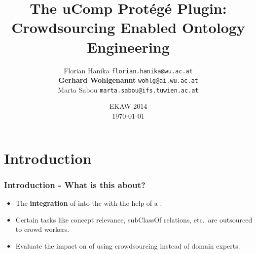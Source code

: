 \documentclass{beamer}
\title[uComp Prot\'eg\'e Plugin]{The uComp Prot\'eg\'e Plugin:\\ Crowdsourcing Enabled Ontology Engineering}
\author[Hanika et al.]{
\small{
Florian Hanika \inst{1} \texttt{florian.hanika@wu.ac.at} \\
\textbf{Gerhard Wohlgenannt} \inst{1} \texttt{wohlg@ai.wu.ac.at} \\
Marta Sabou\inst{2}  \texttt{marta.sabou@ifs.tuwien.ac.at} \\
}}
\institute{Institut f. Informationswirtschaft}
\institute[InfoBiz, WU Vienna] %
{
  \inst{1}%
  Institute f. Information Business,
  \textbf{Vienna Univ. of Economics (WU)}, Austria

  \inst{2}%
  \textbf{Technical University (TU), Vienna}, Austria
}
\date[EKAW 2014]{EKAW 2014\\ \today}
\begin{document}

\begin{frame}
  \titlepage
\end{frame}

%
%
%
%
%
%




\section{Introduction}
\begin{frame}
  \frametitle{Introduction - What is this about?}
  \begin{itemize}
        \item The \textbf{integration} of  into the  with the help of a .
    \vspace{0.5cm}
        \item Certain tasks like  concept relevance, subClassOf relations, etc.~are outsourced to crowd workers.
    \vspace{0.5cm}
        \item Evaluate the impact on  of using crowdsourcing instead of domain experts.
  \end{itemize}
\end{frame}
\end{document}
